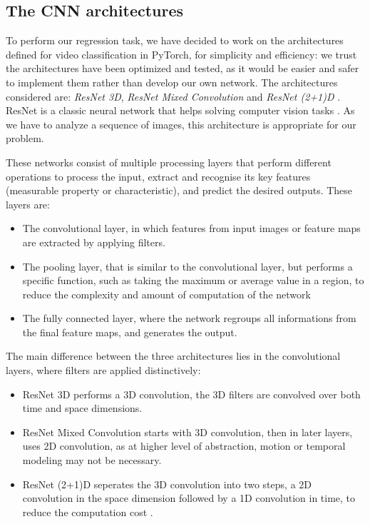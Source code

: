 \documentclass[10pt,conference]{IEEEtran}
\begin{document}
\subsection{The CNN architectures}
To perform our regression task, we have decided to work on the architectures defined for video classification in PyTorch, for simplicity and efficiency: we trust the architectures have been optimized and tested, as it would be easier and safer to implement them rather than develop our own network. The architectures considered are: \textit{ResNet 3D}, \textit{ResNet Mixed Convolution} and \textit{ResNet (2+1)D} \cite{resnets}. ResNet is a classic neural network that helps solving computer vision tasks \cite{hara3dcnns}. As we have to analyze a sequence of images, this architecture is appropriate for our problem.\par
These networks consist of multiple processing layers that perform different operations to process the input, extract and recognise its key features (measurable property or characteristic), and predict the desired outputs. These layers are:
\begin{itemize}
  \item The convolutional layer, in which features from input images or feature maps are extracted by applying filters.
  \item The pooling layer, that is similar to the convolutional layer, but performs a specific function, such as taking the maximum or average value in a region, to reduce the complexity and amount of computation of the network 
  \item The fully connected layer, where the network regroups all informations from the final feature maps, and generates the output.
\end{itemize}

The main difference between the three architectures lies in the convolutional layers, where filters are applied distinctively:
\begin{itemize}
  \item ResNet 3D performs a 3D convolution, the 3D filters are convolved over both time and space dimensions.
  \item ResNet Mixed Convolution starts with 3D convolution, then in later layers, uses 2D convolution, as at higher level of abstraction, motion or temporal modeling may not be necessary.
  \item ResNet (2+1)D seperates the 3D convolution into two steps, a 2D convolution in the space dimension followed by a 1D convolution in time, to reduce the computation cost \cite{spacetimeconv}.
\end{itemize}
\end{document}
